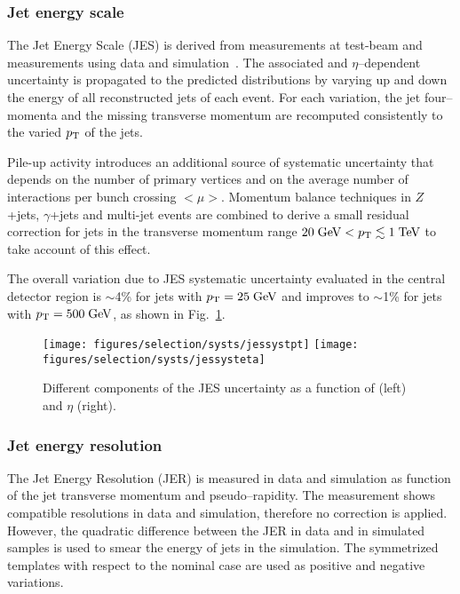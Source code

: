 \subsubsection{Jet energy scale}
\label{sec:syst_jes}

The Jet Energy Scale (JES) is derived from measurements at test-beam 
and measurements using data and simulation~\cite{jes}. 
The associated \pt{} and $\eta$--dependent uncertainty is propagated
to the predicted distributions by varying up and down the energy of
all reconstructed jets of each event. For each variation, the jet
four--momenta and the missing transverse momentum
\met{} are recomputed consistently to the varied $p_{\mathrm{T}}$ of the jets.

Pile-up activity introduces an additional source of systematic 
uncertainty that depends on the number of primary vertices
and on the average number of interactions per bunch crossing $<\mu>$. 
Momentum balance techniques in $Z$+jets, $\gamma$+jets and 
multi-jet events are combined to derive a small residual correction
for jets in the transverse momentum range $20\; \mathrm{GeV}{}<p_{\mathrm{T}}{}\lesssim
1\; \mathrm{TeV}$ to take account of this effect.

The overall variation due to JES systematic uncertainty 
evaluated in the central detector region 
is $\sim$4\% for jets with $p_{\mathrm{T}}{}=25\; \mathrm{GeV}$ and improves to $\sim$1\% for  
jets with $p_{\mathrm{T}}=500\; \mathrm{GeV}$, as shown in Fig.~\ref{fig:jessyst}.

\begin{figure}\centering
  \texttt{[image: figures/selection/systs/jessystpt]}
  \texttt{[image: figures/selection/systs/jessysteta]}
  \caption{
    Different components of the JES uncertainty as a function of \pt{}
    (left) and $\eta$ (right).
  }
  \label{fig:jessyst}
\end{figure}

\subsubsection{Jet energy resolution}
\label{sec:syst_jer}

The Jet Energy Resolution (JER) is measured in data and simulation
as function of the jet transverse momentum and pseudo--rapidity.
The measurement shows compatible resolutions in data and simulation,
therefore no correction is applied. However, the quadratic difference
between the JER in data and in simulated samples is used to smear the
energy of jets in the simulation. The symmetrized templates with
respect to the nominal case are used as positive and negative
variations.

